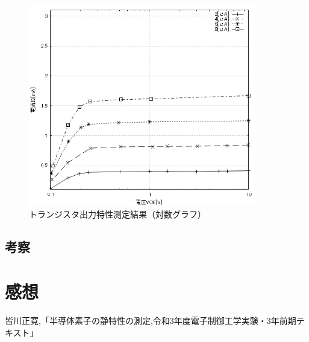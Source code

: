 \documentclass[titlepage]{jarticle}
\begin{document}
\begin{figure}[H]
    \begin{center}
        \includegraphics[width=10cm]{graph/6t.png}
        \caption{トランジスタ出力特性測定結果（対数グラフ）}
        \label{fig:トランジスタ出力特性測定結果（対数グラフ）}
    \end{center}
\end{figure}
\subsection{考察}

\newpage
\section{感想}

\begin{thebibliography}{99}
    \bibitem{}皆川正寛,「半導体素子の静特性の測定,令和3年度電子制御工学実験・3年前期テキスト」
\end{thebibliography}
\end{document}
